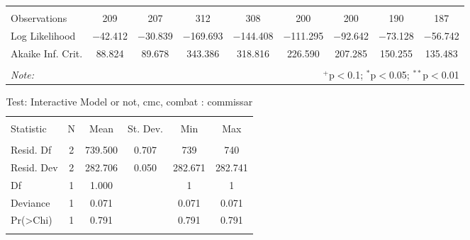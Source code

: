 \documentclass[12pt,letterpaper]{article}
\begin{document}
\begin{table}[!htbp]
\begin{tabular}{@{\extracolsep{5pt}}lcccccccc}
		\hline \\[-1.8ex] 
		Observations & 209 & 207 & 312 & 308 & 200 & 200 & 190 & 187 \\ 
		Log Likelihood & $-$42.412 & $-$30.839 & $-$169.693 & $-$144.408 & $-$111.295 & $-$92.642 & $-$73.128 & $-$56.742 \\ 
		Akaike Inf. Crit. & 88.824 & 89.678 & 343.386 & 318.816 & 226.590 & 207.285 & 150.255 & 135.483 \\ 
		\hline 
		\hline \\[-1.8ex] 
		\textit{Note:}  & \multicolumn{8}{r}{$^{+}$p$<$0.1; $^{*}$p$<$0.05; $^{**}$p$<$0.01}} \\ 
\end{tabular} 
\end{table} 



\begin{table}[!htbp] \centering 
	\caption{Test: Interactive Model or not, cmc, combat : commissar} 
	\label{} 
	\begin{tabular}{@{\extracolsep{5pt}}lccccc} 
		\\[-1.8ex]\hline 
		\hline \\[-1.8ex] 
		Statistic & \multicolumn{1}{c}{N} & \multicolumn{1}{c}{Mean} & \multicolumn{1}{c}{St. Dev.} & \multicolumn{1}{c}{Min} & \multicolumn{1}{c}{Max} \\ 
		\hline \\[-1.8ex] 
		Resid. Df & 2 & 739.500 & 0.707 & 739 & 740 \\ 
		Resid. Dev & 2 & 282.706 & 0.050 & 282.671 & 282.741 \\ 
		Df & 1 & 1.000 &  & 1 & 1 \\ 
		Deviance & 1 & 0.071 &  & 0.071 & 0.071 \\ 
		Pr(\textgreater Chi) & 1 & 0.791 &  & 0.791 & 0.791 \\ 
		\hline \\[-1.8ex] 
	\end{tabular} 
\end{table}
\end{document}
